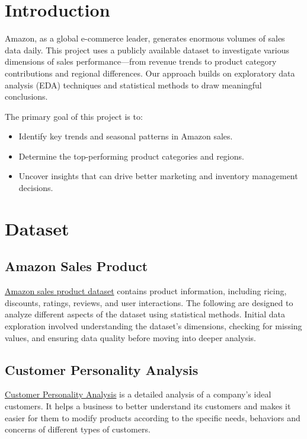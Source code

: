 \documentclass[a4paper]{article}
\begin{document}
 
\begin{multicols}{2}
\setlength{\columnsep}{0.5cm}


\section{Introduction}
Amazon, as a global e-commerce leader, generates enormous volumes of sales data daily. This project uses a publicly available dataset to investigate various dimensions of sales performance—from revenue trends to product category contributions and regional differences. Our approach builds on exploratory data analysis (EDA) techniques and statistical methods to draw meaningful conclusions.

The primary goal of this project is to:
\begin{itemize}
    \item Identify key trends and seasonal patterns in Amazon sales.
    \item Determine the top-performing product categories and regions.
    \item Uncover insights that can drive better marketing and inventory management decisions.
\end{itemize}


\section{Dataset}
\subsection{Amazon Sales Product}
\href{https://www.kaggle.com/datasets/mahlaentezari/amazon-dataset}{Amazon sales product dataset} contains product information, including ricing, discounts, ratings, reviews, and user interactions. The following are designed to analyze different aspects of the dataset using statistical methods.
Initial data exploration involved understanding the dataset's dimensions, checking for missing values, and ensuring data quality before moving into deeper analysis.

\subsection{Customer Personality Analysis}
\href{https://www.kaggle.com/datasets/imakash3011/customer-personality-analysis/data}{Customer Personality Analysis} is a detailed analysis of a company’s ideal customers. It helps a business to better understand its customers and makes it easier for them to modify products according to the specific needs, behaviors and concerns of different types of customers.


\end{multicols}
\end{document}
